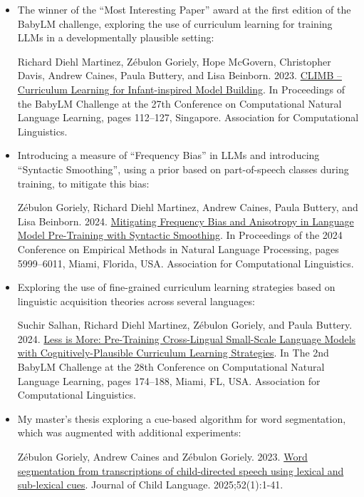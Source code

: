 \begin{itemize}
\item The winner of the \enquote{Most Interesting Paper} award at the first edition of the BabyLM challenge, exploring the use of curriculum learning for training LLMs in a developmentally plausible setting:
\begin{mdframed}[linewidth=1pt]
    Richard Diehl Martinez, Zébulon Goriely, Hope McGovern, Christopher Davis, Andrew Caines, Paula Buttery, and Lisa Beinborn. 2023. \href{https://aclanthology.org/2023.conll-babylm.10/}{CLIMB – Curriculum Learning for Infant-inspired Model Building}. In Proceedings of the BabyLM Challenge at the 27th Conference on Computational Natural Language Learning, pages 112–127, Singapore. Association for Computational Linguistics.
\end{mdframed}

\item Introducing a measure of \enquote{Frequency Bias} in LLMs and introducing \enquote{Syntactic Smoothing}, using a prior based on part-of-speech classes during training, to mitigate this bias:
\begin{mdframed}[linewidth=1pt]
    Zébulon Goriely, Richard Diehl Martinez, Andrew Caines, Paula Buttery, and Lisa Beinborn. 2024. \href{https://aclanthology.org/2024.emnlp-main.344/}{Mitigating Frequency Bias and Anisotropy in Language Model Pre-Training with Syntactic Smoothing}. In Proceedings of the 2024 Conference on Empirical Methods in Natural Language Processing, pages 5999–6011, Miami, Florida, USA. Association for Computational Linguistics.
\end{mdframed}

\item Exploring the use of fine-grained curriculum learning strategies based on linguistic acquisition theories across several languages:
\begin{mdframed}[linewidth=1pt]
    Suchir Salhan, Richard Diehl Martinez, Zébulon Goriely, and Paula Buttery. 2024. \href{https://aclanthology.org/2024.conll-babylm.15/}{Less is More: Pre-Training Cross-Lingual Small-Scale Language Models with Cognitively-Plausible Curriculum Learning Strategies}. In The 2nd BabyLM Challenge at the 28th Conference on Computational Natural Language Learning, pages 174–188, Miami, FL, USA. Association for Computational Linguistics.
\end{mdframed}

\item My master's thesis exploring a cue-based algorithm for word segmentation, which was augmented with additional experiments:
\begin{mdframed}[linewidth=1pt]
    Zébulon Goriely, Andrew Caines and Zébulon Goriely. 2023. \href{https://www.cambridge.org/core/journals/journal-of-child-language/article/word-segmentation-from-transcriptions-of-childdirected-speech-using-lexical-and-sublexical-cues/5D206536C878ADA80026ED8E2E72F848}{Word segmentation from transcriptions of child-directed speech using lexical and sub-lexical cues}. Journal of Child Language. 2025;52(1):1-41.
\end{mdframed}
\end{itemize}

